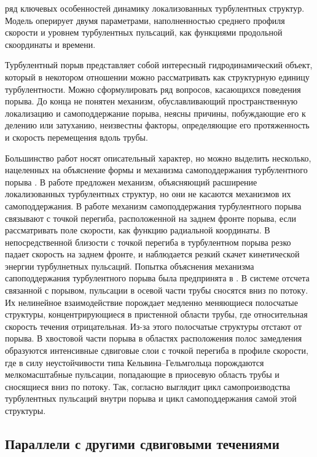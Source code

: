 ряд ключевых особенностей динамику локализованных турбулентных структур. Модель оперирует двумя параметрами, наполненностью среднего профиля скорости и уровнем турбулентных пульсаций, как функциями продольной скоординаты и времени. 


Турбулентный порыв представляет собой интересный гидродинамический объект, который в некотором отношении можно рассматривать как структурную единицу турбулентности. Можно сформулировать ряд вопросов, касающихся поведения порыва. До конца не понятен механизм, обуславливающий пространственную локализацию и самоподдержание порыва, неясны причины, побуждающие его к делению или затуханию, неизвестны факторы, определяющие его протяженность и скорость перемещения вдоль трубы.

Большинство работ носят описательный характер, но можно выделить несколько, нацеленных на объяснение формы и механизма самоподдержания турбулентного порыва \cite{Duguet2010, Hof2010, Shimizu2009}. В работе \cite{Duguet2010} предложен механизм, объясняющий расширение локализованных турбулентных структур, но они не касаются механизмов их самоподдержания. В работе \cite{Hof2010} механизм самоподдержания турбулентного порыва связывают с точкой перегиба, расположенной на заднем фронте порыва, если рассматривать поле скорости, как функцию радиальной координаты. В непосредственной близости с точкой перегиба в турбулентном порыва резко падает скорость на заднем фронте, и наблюдается резкий скачет кинетической энергии турбулнетных пульсаций. 
Попытка объяснения механизма сапоподдержания турбулентного порыва была предпринята в \cite{Shimizu2009}. В системе отсчета связанной с порывом, пульсации в осевой части трубы сносятся вниз по потоку. Их нелинейное взаимодействие порождает медленно меняющиеся полосчатые структуры, концентрирующиеся в пристенной области трубы, где относительная скорость течения отрицательная. Из-за этого полосчатые структуры отстают от порыва. В хвостовой части порыва в областях расположения полос замедления образуются интенсивные сдвиговые слои с точкой перегиба в профиле скорости, где в силу неустойчивости типа Кельвина--Гельмгольца порождаются мелкомасштабные пульсации, попадающие в приосевую область трубы и сносящиеся вниз по потоку. Так, согласно \cite{Shimizu2009} выглядит цикл самопроизводства турбулентных пульсаций внутри порыва и цикл самоподдержания самой этой структуры.


	\subsection{Параллели с другими сдвиговыми течениями}

